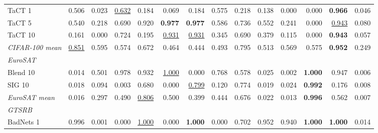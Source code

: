 \begin{table}[htbp]
\begin{adjustbox}{max width=\textwidth}
\begin{tabular}{lrrrrrrrrrrrrr}
TaCT 1 & 0.506 & \textcolor{black!45}{0.023} & \underline{0.632} & \textcolor{black!45}{0.184} & \textcolor{black!45}{0.069} & \textcolor{black!45}{0.184} & 0.575 & \textcolor{black!45}{0.218} & \textcolor{black!45}{0.138} & \textcolor{black!45}{0.000} & \textcolor{black!45}{0.000} & \textbf{0.966} & \textcolor{black!45}{0.046} \\
TaCT 5 & 0.540 & \textcolor{black!45}{0.218} & 0.690 & 0.920 & \textbf{0.977} & \textbf{0.977} & 0.586 & 0.736 & 0.552 & \textcolor{black!45}{0.241} & \textcolor{black!45}{0.000} & \underline{0.943} & \textcolor{black!45}{0.080} \\
TaCT 10 & \textcolor{black!45}{0.161} & \textcolor{black!45}{0.000} & 0.724 & \textcolor{black!45}{0.195} & \underline{0.931} & \underline{0.931} & \textcolor{black!45}{0.345} & 0.690 & \textcolor{black!45}{0.379} & \textcolor{black!45}{0.115} & \textcolor{black!45}{0.000} & \textbf{0.943} & \textcolor{black!45}{0.057} \\
\rowcolor{black!8}\emph{CIFAR-100 mean} & \underline{0.851} & 0.595 & 0.574 & 0.672 & \textcolor{black!45}{0.464} & \textcolor{black!45}{0.444} & \textcolor{black!45}{0.493} & 0.795 & 0.513 & 0.569 & 0.575 & \textbf{0.952} & \textcolor{black!45}{0.249} \\
\multicolumn{14}{l}{\emph{EuroSAT}} \\
Blend 10 & \textcolor{black!45}{0.014} & 0.501 & 0.978 & 0.932 & \underline{1.000} & \textcolor{black!45}{0.000} & 0.768 & 0.578 & \textcolor{black!45}{0.025} & \textcolor{black!45}{0.002} & \textbf{1.000} & 0.947 & \textcolor{black!45}{0.006} \\
SIG 10 & \textcolor{black!45}{0.018} & \textcolor{black!45}{0.094} & \textcolor{black!45}{0.003} & 0.680 & \textcolor{black!45}{0.000} & \underline{0.799} & \textcolor{black!45}{0.120} & 0.774 & \textcolor{black!45}{0.019} & \textcolor{black!45}{0.024} & \textbf{0.992} & \textcolor{black!45}{0.176} & \textcolor{black!45}{0.008} \\
\rowcolor{black!8}\emph{EuroSAT mean} & \textcolor{black!45}{0.016} & \textcolor{black!45}{0.297} & \textcolor{black!45}{0.490} & \underline{0.806} & \textcolor{black!45}{0.500} & \textcolor{black!45}{0.399} & \textcolor{black!45}{0.444} & 0.676 & \textcolor{black!45}{0.022} & \textcolor{black!45}{0.013} & \textbf{0.996} & 0.562 & \textcolor{black!45}{0.007} \\
\multicolumn{14}{l}{\emph{GTSRB}} \\
BadNets 1 & 0.996 & \textcolor{black!45}{0.001} & \textcolor{black!45}{0.000} & \underline{1.000} & \textcolor{black!45}{0.000} & \textbf{1.000} & \textcolor{black!45}{0.000} & 0.702 & 0.952 & 0.940 & \textbf{1.000} & \textbf{1.000} & \textcolor{black!45}{0.014} \\

\end{tabular}
\end{adjustbox}
\end{table}
